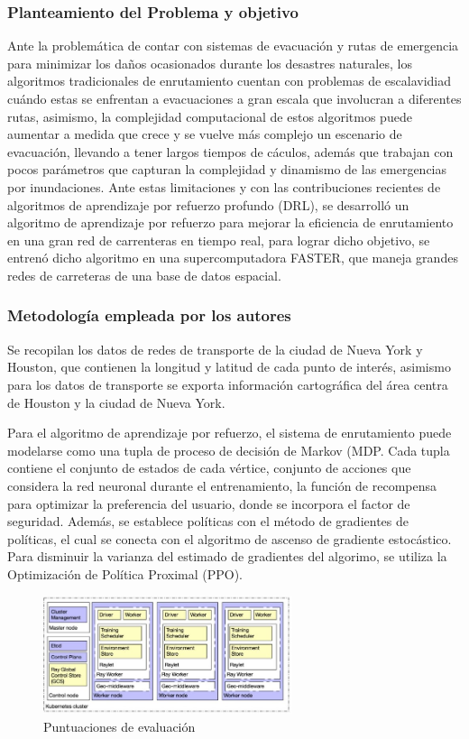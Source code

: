 \subsubsection{Planteamiento del Problema y objetivo }
Ante la problemática de contar con sistemas de evacuación y rutas de emergencia para minimizar los daños ocasionados durante los desastres naturales, los algoritmos tradicionales de enrutamiento cuentan con problemas de escalavidiad cuándo estas se enfrentan a evacuaciones a gran escala que involucran a diferentes rutas, asimismo, la complejidad computacional de estos algoritmos puede aumentar a medida que crece y se vuelve más complejo un escenario de evacuación, llevando a tener largos tiempos de cáculos, además que trabajan con pocos parámetros que capturan la complejidad y dinamismo de las emergencias por inundaciones. Ante estas limitaciones y con las contribuciones recientes de algoritmos de aprendizaje por refuerzo profundo (DRL), se desarrolló un algoritmo de aprendizaje por refuerzo para mejorar la eficiencia de enrutamiento en una gran red de carrenteras en tiempo real, para lograr dicho objetivo, se entrenó dicho algoritmo en una supercomputadora FASTER, que maneja grandes redes de carreteras de una base de datos espacial.

\subsubsection{Metodología empleada por los autores}
Se recopilan los datos de redes de transporte de la ciudad de Nueva York y Houston, que contienen la longitud y latitud de cada punto de interés, asimismo para los datos de transporte se exporta información cartográfica del área centra de Houston y la ciudad de Nueva York. 

Para el algoritmo de aprendizaje por refuerzo, el sistema de enrutamiento puede modelarse como una tupla de proceso de decisión de Markov (MDP. Cada tupla contiene el conjunto de estados de cada vértice, conjunto de acciones que considera la red neuronal durante el entrenamiento, la función de recompensa para optimizar la preferencia del usuario, donde se incorpora el factor de seguridad. Además, se establece políticas con el método de gradientes de políticas, el cual se conecta con el algoritmo de ascenso de gradiente estocástico. Para disminuir la varianza del estimado de gradientes del algorimo, se utiliza la Optimización de Política Proximal (PPO). 

\begin{figure}[h]
	\begin{center}
		\includegraphics[width=0.65\textwidth]{2/figures/algoMod.jpg}
		\caption{Puntuaciones de evaluación}
		\label{1:fig2}
	\end{center}
\end{figure}

